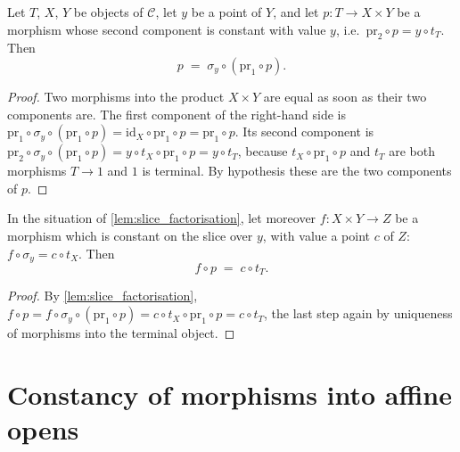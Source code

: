 \begin{lemma}
  \label{lem:slice_factorisation}
  \leanok
  Let \(T\), \(X\), \(Y\) be objects of \(\mathcal C\), let \(y\) be a point of \(Y\), and
  let \(p : T \to X \times Y\) be a morphism whose second component is constant with value
  \(y\), i.e.\ \(\mathrm{pr}_2 \circ p = y \circ t_T\). Then
  \[
    p \;=\; \sigma_y \circ (\mathrm{pr}_1 \circ p).
  \]
\end{lemma}
\begin{proof}
  \leanok
  Two morphisms into the product \(X \times Y\) are equal as soon as their two components
  are. The first component of the right-hand side is
  \(\mathrm{pr}_1 \circ \sigma_y \circ (\mathrm{pr}_1 \circ p)
    = \mathrm{id}_X \circ \mathrm{pr}_1 \circ p = \mathrm{pr}_1 \circ p\). Its second
  component is
  \(\mathrm{pr}_2 \circ \sigma_y \circ (\mathrm{pr}_1 \circ p)
    = y \circ t_X \circ \mathrm{pr}_1 \circ p = y \circ t_T\), because
  \(t_X \circ \mathrm{pr}_1 \circ p\) and \(t_T\) are both morphisms \(T \to 1\) and \(1\) is
  terminal. By hypothesis these are the two components of \(p\).
\end{proof}

\begin{lemma}
  \label{lem:slice_constancy_transfer}
  \leanok
  In the situation of \ref{lem:slice_factorisation}, let moreover \(f : X \times Y \to Z\) be
  a morphism which is constant on the slice over \(y\), with value a point \(c\) of \(Z\):
  \(f \circ \sigma_y = c \circ t_X\). Then
  \[
    f \circ p \;=\; c \circ t_T .
  \]
\end{lemma}
\begin{proof}
  \leanok
  By \ref{lem:slice_factorisation},
  \(f \circ p = f \circ \sigma_y \circ (\mathrm{pr}_1 \circ p)
    = c \circ t_X \circ \mathrm{pr}_1 \circ p = c \circ t_T\),
  the last step again by uniqueness of morphisms into the terminal object.
\end{proof}

\section{Constancy of morphisms into affine opens}

